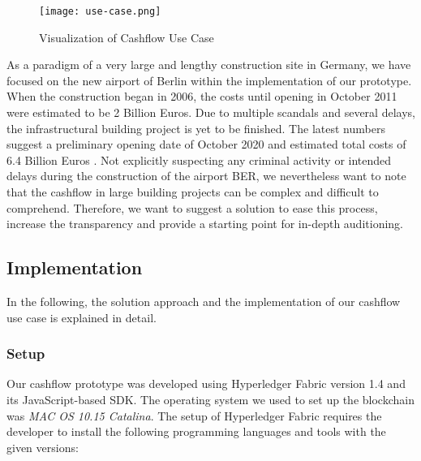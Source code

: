 \begin{figure}[]
	\centering
	\texttt{[image: use-case.png]}
	\caption{Visualization of Cashflow Use Case}
	\label{fig:use-case}
	\vspace{-3mm} %
\end{figure}
As a paradigm of a very large and lengthy construction site in Germany, we have focused on the new airport of Berlin within the implementation of our prototype.
When the construction began in 2006, the costs until opening in October 2011 were estimated to be 2 Billion Euros. Due to multiple scandals and several delays, the infrastructural building project is yet to be finished. The latest numbers suggest a preliminary opening date of October 2020 and estimated total costs of 6.4 Billion Euros \cite{Berlin2020}. Not explicitly suspecting any criminal activity or intended delays during the construction of the airport BER, we nevertheless want to note that the cashflow in large building projects can be complex and difficult to comprehend. Therefore, we want to suggest a solution to ease this process, increase the transparency and provide a starting point for in-depth auditioning.

\subsection{Implementation} \label{implementation}
In the following, the solution approach and the implementation of our cashflow use case is explained in detail. 

\subsubsection{Setup} \label{setup}
Our cashflow prototype was developed using Hyperledger Fabric version 1.4 and its JavaScript-based SDK. The operating system we used to set up the blockchain was \textit{MAC OS 10.15 Catalina}. 
The setup of Hyperledger Fabric requires the developer to install the following programming languages and tools with the given versions: 

